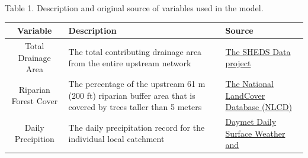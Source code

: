 Table 1. Description and original source of variables used in the model.

\begin{longtable}[]{@{}cll@{}}
\toprule
\begin{minipage}[b]{0.19\columnwidth}\centering\strut
Variable\strut
\end{minipage} & \begin{minipage}[b]{0.43\columnwidth}\raggedright\strut
Description\strut
\end{minipage} & \begin{minipage}[b]{0.23\columnwidth}\raggedright\strut
Source\strut
\end{minipage}\tabularnewline
\midrule
\endhead
\begin{minipage}[t]{0.19\columnwidth}\centering\strut
Total Drainage Area\strut
\end{minipage} & \begin{minipage}[t]{0.43\columnwidth}\raggedright\strut
The total contributing drainage area from the entire upstream
network\strut
\end{minipage} & \begin{minipage}[t]{0.23\columnwidth}\raggedright\strut
\href{http://conte-ecology.github.io/shedsData/}{The SHEDS Data
project}\strut
\end{minipage}\tabularnewline
\begin{minipage}[t]{0.19\columnwidth}\centering\strut
Riparian Forest Cover\strut
\end{minipage} & \begin{minipage}[t]{0.43\columnwidth}\raggedright\strut
The percentage of the upstream 61 m (200 ft) riparian buffer area that
is covered by trees taller than 5 meters\strut
\end{minipage} & \begin{minipage}[t]{0.23\columnwidth}\raggedright\strut
\href{http://www.mrlc.gov/nlcd06_data.php}{The National LandCover
Database (NLCD)}\strut
\end{minipage}\tabularnewline
\begin{minipage}[t]{0.19\columnwidth}\centering\strut
Daily Precipition\strut
\end{minipage} & \begin{minipage}[t]{0.43\columnwidth}\raggedright\strut
The daily precipitation record for the individual local catchment\strut
\end{minipage} & \begin{minipage}[t]{0.23\columnwidth}\raggedright\strut
\href{https://daymet.ornl.gov/}{Daymet Daily Surface Weather and
}
\end{minipage}
\end{longtable}

